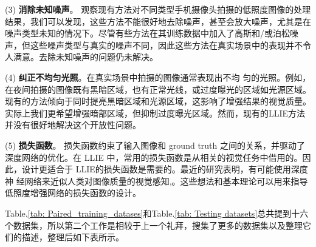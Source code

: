 \documentclass[letterpaper,12pt]{article}
\begin{document}
		(3) \textbf{消除未知噪声}。 观察现有方法对不同类型手机摄像头拍摄的低照度图像的处理结果，我们可以发现，这些方法不能很好地去除噪声，甚至会放大噪声，尤其是在噪声类型未知的情况下。尽管有些方法在其训练数据中加入了高斯和/或泊松噪声，但这些噪声类型与真实的噪声不同，因此这些方法在真实场景中的表现并不令人满意。去除未知噪声的问题仍未解决。
		
		(4) \textbf{纠正不均匀光照}。在真实场景中拍摄的图像通常表现出不均
		匀的光照。例如，在夜间拍摄的图像既有黑暗区域，也有正常光线，或过度曝光的区域如光源区域。现有的方法倾向于同时提亮黑暗区域和光源区域，这影响了增强结果的视觉质量。实际上我们更希望增强暗部区域，但抑制过度曝光区域。然而，现有的LLIE方法并没有很好地解决这个开放性问题。
		
		(5) \textbf{损失函数}。 损失函数约束了输入图像和 ground truth 之间的关系，并驱动了深度网络的优化。在 LLIE 中，常用的损失函数是从相关的视觉任务中借用的。因此，设计更适合于 LLIE的损失函数是需要的。最近的研究表明，有可能使用深度神	经网络来近似人类对图像质量的视觉感知\cite{fang2020perceptual},\cite{talebi2018nima}。这些想法和基本理论可以用来指导低照度增强网络的损失函数的设计。
		
		Table.\ref{tab: Paired_training_datases}和Table.\ref{tab: Testing datasets}总共提到十六个数据集，所以第二个工作是相较于上一个礼拜，搜集了更多的数据集以及整理它们的描述，整理后如下表所示。
		
\end{document}
